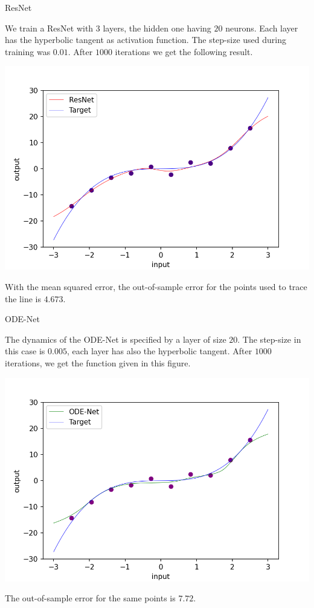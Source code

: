 \documentclass[11pt]{beamer}
\begin{document}
\begin{frame}{ResNet}

We train a ResNet with $3$ layers, the hidden one having $20$ neurons. Each layer has the hyperbolic tangent as activation function. The step-size used during training was $0.01$. After $1000$ iterations we get the following result.


\begin{center}
\includegraphics[scale=0.4]{ex_resnet.png}
\end{center}

With the mean squared error, the out-of-sample error for the points used to trace the line is $4.673$.
\end{frame}

\begin{frame}{ODE-Net}

The dynamics of the ODE-Net is specified by a layer of size $20$. The step-size in this case is $0.005$, each layer has also the hyperbolic tangent. After $1000$ iterations, we get the function given in this figure.

\begin{center}
\includegraphics[scale=0.45]{ex_odenet_final.png}
\end{center}

The out-of-sample error for the same points is $7.72$.
\end{frame}
\end{document}
